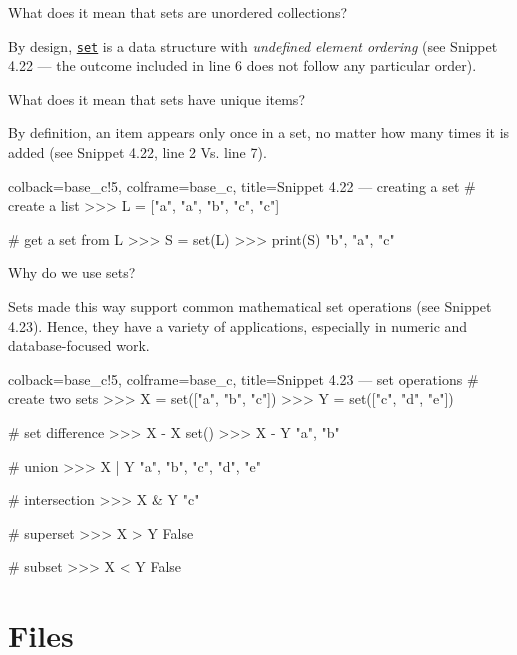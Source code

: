 \documentclass[a4paper,11pt]{book}
\numberwithin{figure}{chapter}
\numberwithin{table}{chapter}
\newcommand{\question}[1]{%
    \begin{tcolorbox}[colback=comp_c!10,colframe=comp_c,sidebyside align=top,width=\linewidth,before skip=1ex]
        #1
    \end{tcolorbox}%
    \switchcolumn%
}
\newcommand{\note}[1]{%
    \begin{tcolorbox}[colback=white!0,colframe=white!10,width=\linewidth,before skip=1ex]
        #1
    \end{tcolorbox}         
}
\begin{document}
\begin{paracol}{2}
	\question{\raggedright What does it mean that sets are unordered collections?}
	\note{By design, \href{https://docs.python.org/3/tutorial/datastructures.html#sets}{\texttt{set}} is a data structure with \emph{undefined element ordering} (see Snippet 4.22 --- the outcome included in line 6 does not follow any particular order).}
\end{paracol}

\begin{paracol}{2}
	\question{\raggedright What does it mean that sets have unique items?}
	\note{By definition, an item appears only once in a set, no matter how many times it is added (see Snippet 4.22, line 2 Vs. line 7).}
\end{paracol}

\clearpage

\begin{pythoncode}[linenos=true,]{colback=base_c!5, colframe=base_c, title=\sffamily Snippet 4.22 --- creating a set}
# create a list
>>> L = ["a", "a", "b", "c", "c"]

# get a set from L
>>> S = set(L)
>>> print(S)
{"b", "a", "c"}
\end{pythoncode}

\begin{paracol}{2}
	\question{\raggedright Why do we use sets?}
	\note{Sets made this way support common mathematical set operations (see Snippet 4.23). Hence, they have a variety of applications, especially in numeric and database-focused work. }
\end{paracol}

\begin{pythoncode}[linenos=true,]{colback=base_c!5, colframe=base_c, title=\sffamily Snippet 4.23 --- set operations}
# create two sets 
>>> X = set(["a", "b", "c"])
>>> Y = set(["c", "d", "e"])

# set difference 
>>> X - X
set()
>>> X - Y
{"a", "b"}

# union
>>> X | Y
{"a", "b", "c", "d", "e"}

# intersection
>>> X & Y
{"c"}

# superset
>>> X > Y
False

# subset
>>> X < Y
False
\end{pythoncode}
\clearpage

\section{Files}
\end{document}
